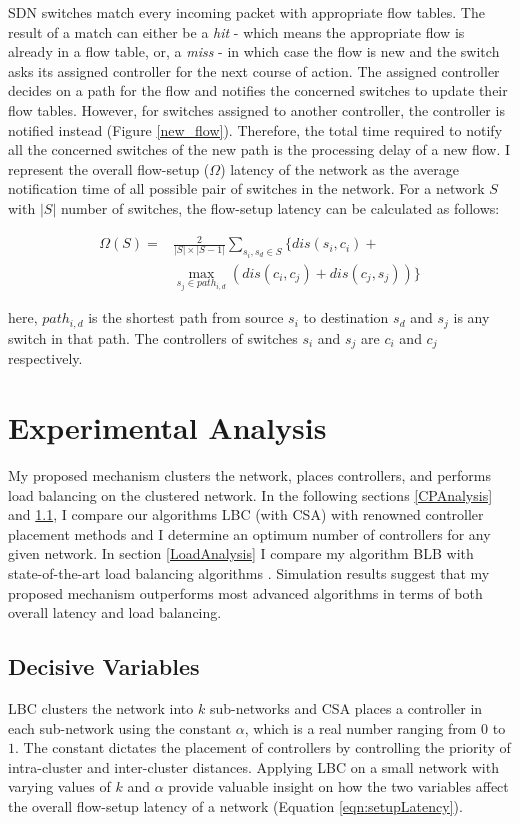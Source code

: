 \documentclass{IEEEtran}
\begin{document}
	SDN switches match every incoming packet with appropriate flow tables. The result of a match can either be a \textit{hit} - which means the appropriate flow is already in a flow table, or, a \textit{miss} - in which case the flow is new and the switch asks its assigned controller for the next course of action. The assigned controller decides on a path for the flow and notifies the concerned switches to update their flow tables. However, for switches assigned to another controller, the controller is notified instead (Figure \ref{new_flow}). Therefore, the total time required to notify all the concerned switches of the new path is the processing delay of a new flow. I represent the overall flow-setup ($\Omega$) latency of the network as the average notification time of all possible pair of switches in the network. For a network $S$ with $|S|$ number of switches, the flow-setup latency can be calculated as follows:
	
	\begin{equation} \label{eqn:setupLatency}
	\begin{split}
	\Omega(S) = &\frac{2}{|S|\times |S-1|}\sum_{s_i,s_d\in S} \{dis(s_i,c_i)+\\ &\max_{s_j\in path_{i,d}}\left(dis(c_i,c_j)+dis(c_j,s_j) \right) \}
	\end{split}
	\end{equation}
	
	here, $path_{i,d}$ is the shortest path from source $s_i$ to destination $s_d$ and $s_j$ is any switch in that path. The controllers of switches $s_i$ and $s_j$ are $c_i$ and $c_j$ respectively.
	
	\section{Experimental Analysis}
	My proposed mechanism clusters the network, places controllers, and performs load balancing on the clustered network. In the following sections \ref{CPAnalysis} and \ref{optimumK}, I compare our algorithms LBC (with CSA) with renowned controller placement methods and I determine an optimum number of controllers for any given network. In section \ref{LoadAnalysis} I compare my algorithm BLB with state-of-the-art load balancing algorithms \cite{dbcp2017, filali2018sdn}. Simulation results suggest that my proposed mechanism outperforms most advanced algorithms in terms of both overall latency and load balancing.
	
	
	\subsection{Decisive Variables} \label{optimumK}
	LBC clusters the network into $k$ sub-networks and CSA places a controller in each sub-network using the constant $\alpha$, which is a real number ranging from $0$ to $1$. The constant dictates the placement of controllers by controlling the priority of intra-cluster and inter-cluster distances. Applying LBC on a small network with varying values of $k$ and $\alpha$ provide valuable insight on how the two variables affect the overall flow-setup latency of a network (Equation \ref{eqn:setupLatency}).
	
\end{document}
